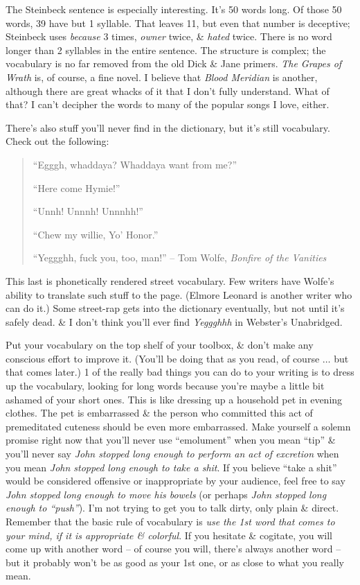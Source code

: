 \documentclass{article}
\numberwithin{equation}{section}
\begin{document}
The Steinbeck sentence is especially interesting. It's 50 words long. Of those 50 words, 39 have but 1 syllable. That leaves 11, but even that number is deceptive; Steinbeck uses \textit{because} 3 times, \textit{owner} twice, \& \textit{hated} twice. There is no word longer than 2 syllables in the entire sentence. The structure is complex; the vocabulary is no far removed from the old Dick \& Jane primers. \textit{The Grapes of Wrath} is, of course, a fine novel. I believe that \textit{Blood Meridian} is another, although there are great whacks of it that I don't fully understand. What of that? I can't decipher the words to many of the popular songs I love, either.

There's also stuff you'll never find in the dictionary, but it's still vocabulary. Check out the following:
\begin{quotation}
	``Egggh, whaddaya? Whaddaya want from me?''
	
	``Here come Hymie!''
	
	``Unnh! Unnnh! Unnnhh!''
	
	``Chew my willie, Yo' Honor.''
	
	``Yeggghh, fuck you, too, man!'' -- Tom Wolfe, \textit{Bonfire of the Vanities}
\end{quotation}
This last is phonetically rendered street vocabulary. Few writers have Wolfe's ability to translate such stuff to the page. (Elmore Leonard is another writer who can do it.) Some street-rap gets into the dictionary eventually, but not until it's safely dead. \& I don't think you'll ever find \textit{Yeggghhh} in Webster's Unabridged.

Put your vocabulary on the top shelf of your toolbox, \& don't make any conscious effort to improve it. (You'll be doing that as you read, of course $\ldots$ but that comes later.) 1 of the really bad things you can do to your writing is to dress up the vocabulary, looking for long words because you're maybe a little bit ashamed of your short ones. This is like dressing up a household pet in evening clothes. The pet is embarrassed \& the person who committed this act of premeditated cuteness should be even more embarrassed. Make yourself a solemn promise right now that you'll never use ``emolument'' when you mean ``tip'' \& you'll never say \textit{John stopped long enough to perform an act of excretion} when you mean \textit{John stopped long enough to take a shit}. If you believe ``take a shit'' would be considered offensive or inappropriate by your audience, feel free to say \textit{John stopped long enough to move his bowels} (or perhaps \textit{John stopped long enough to ``push''}). I'm not trying to get you to talk dirty, only plain \& direct. Remember that the basic rule of vocabulary is \textit{use the 1st word that comes to your mind, if it is appropriate \& colorful}. If you hesitate \& cogitate, you will come up with another word -- of course you will, there's always another word -- but it probably won't be as good as your 1st one, or as close to what you really mean.
\end{document}
